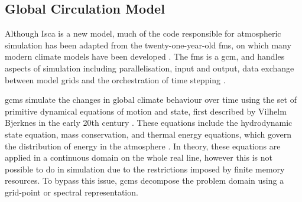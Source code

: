 \documentclass[a4paper,11pt]{report}
\begin{document}
\subsection{Global Circulation Model}
Although Isca is a new model, much of the code responsible for atmospheric simulation has been adapted from the twenty-one-year-old \gls{fms}, on which many modern climate models have been developed \cite{balaji2002fms, donner2011dynamical, farneti2009intermediate}. The \gls{fms} is a \gls{gcm}, and handles aspects of simulation including parallelisation, input and output, data exchange between model grids and the orchestration of time stepping \cite{gfdl2019fms}.
\par
\gls{gcm}s simulate the changes in global climate behaviour over time using the set of primitive dynamical equations of motion and state, first described by Vilhelm Bjerknes in the early 20th century \cite{bjerknes1910dynamic,edwards2011history, godske1957dynamic}. These equations include the hydrodynamic state equation, mass conservation, and thermal energy equations, which govern the distribution of energy in the atmosphere \cite{vallis2018isca,edwards2011history}. In theory, these equations are applied in a continuous domain on the whole real line, however this is not possible to do in simulation due to the restrictions imposed by finite memory resources. To bypass this issue, \gls{gcm}s decompose the problem domain using a grid-point or spectral representation.
\end{document}
